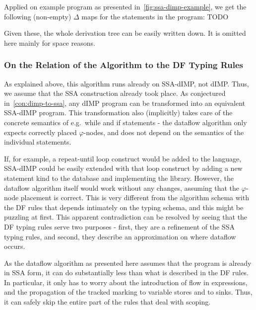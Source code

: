 Applied on example program as presented in~\autoref{fig:ssa-dimp-example}, we 
get the following (non-empty) $\Delta$ maps for the statements in the program:
TODO

Given these, the whole derivation tree can be easily written down.
It is omitted here mainly for space reasons.

\subsubsection*{On the Relation of the Algorithm to the DF Typing Rules}
As explained above, this algorithm runs already on SSA-dIMP, not dIMP.
Thus, we assume that the SSA construction already took place.
As conjectured in~\autoref{con:dimp-to-ssa}, any dIMP program can be transformed into an equivalent
SSA-dIMP program.
This transformation also (implicitly) takes care of the concrete semantics of e.g.\ 
while and if statements - the dataflow algorithm only expects correctly placed $\varphi$-nodes,
and does not depend on the semantics of the individual statements.

If, for example, a repeat-until loop construct would be added to the language,
SSA-dIMP could be easily extended with that loop construct by adding a new statement 
kind to the database and implementing the library.
However, the dataflow algorithm itself would work without any changes, assuming that
the $\varphi$-node placement is correct.
This is very different from the algorithm schema with the DF rules that depends intimately on the 
typing schema, and this might be puzzling at first.
This apparent contradiction can be resolved by seeing that the DF typing 
rules serve two purposes - first, they are a refinement of the SSA typing rules,
and second, they describe an approximation on where dataflow occurs.

As the dataflow algorithm as presented here assumes that the program is already in 
SSA form, it can do substantially less than what is described in the DF rules.
In particular, it only has to worry about the introduction of flow in expressions,
and the propagation of the tracked marking to variable stores and to sinks.
Thus, it can safely skip the entire part of the rules that deal with scoping.


